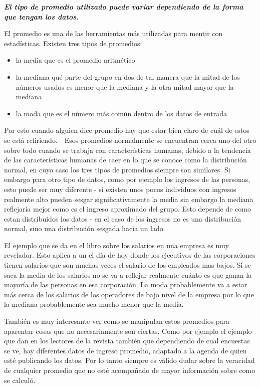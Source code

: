 \documentclass[letterpaper, 11pt]{article}
\begin{document}
\textbf{\textit{El tipo de promedio utilizado puede variar dependiendo de la forma que tengan los datos.}}

El promedio es una de las herramientas más utilizadas para mentir con estadísticas. Existen tres tipos de promedios:

 \begin{itemize}
	\item la media que es el promedio aritmético
	\item la mediana qué parte del grupo en dos de tal manera que la mitad de los números usados es menor que la mediana y la otra mitad mayor que la mediana
	\item la moda que es el número más común dentro de los datos de entrada
\end{itemize} 

Por esto cuando alguien dice promedio hay que estar bien claro de cuál de estos se está refiriendo.  Esos promedios normalmente se encuentran cerca uno del otro sobre todo cuando se trabaja con características humanas, debido a la tendencia de las características humanas de caer en lo que se conoce como la distribución normal, en cuyo caso los tres tipos de promedios siempre son similares. Si embargo para otro tipo de datos, como por ejemplo los ingresos de las personas, esto puede ser muy diferente - si existen unos pocos individuos con ingresos realmente alto pueden sesgar significativamente la media sin embargo la mediana reflejaría mejor como es el ingreso aproximado del grupo. Esto depende de como estan distribuidos los datos - en el caso de los ingresos no es una distribución normal, sino una distribución sesgada hacia un lado.

El ejemplo que se da en el libro sobre los salarios en una empresa es muy revelador. Esto aplica a un el día de hoy donde los ejecutivos de las corporaciones tienen salarios que son muchas veces el salario de los empleados mas bajos. Si se saca la media de los salarios no se va a reflejar realmente cuánto es que ganan la mayoría de las personas en esa corporación. La moda probablemente va a estar más cerca de los salarios de los operadores de bajo nivel de la empresa por lo que la mediana probablemente sea mucho menor que la media.

También es muy interesante ver como se manipulan estos promedios para aparentar cosas que no necesariamente son ciertas. Como por ejemplo el ejemplo que dan en los lectores de la revista también que dependiendo de cual encuestas se ve, hay diferentes datos de ingreso promedio, adaptado a la agenda de quien esté publicando los datos. Por lo tanto siempre es válido dudar sobre la veracidad de cualquier promedio que no esté acompañado de mayor información sobre como se calculó.
\end{document}
